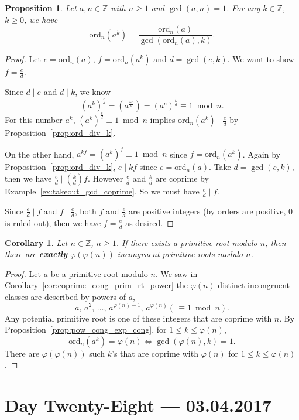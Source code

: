\documentclass{amsbook}
\theoremstyle{plain}
\newtheorem{corollary}[theorem]{Corollary}
\newtheorem{proposition}[theorem]{Proposition}
\theoremstyle{definition}
\theoremstyle{remark}
\numberwithin{equation}{chapter}
\numberwithin{figure}{chapter}
\newcommand{\Z}{\mathbb{Z}}
\newcommand*{\ord}{\text{ord}}
\begin{document}
\begin{proposition}\label{prop:ord_pow}
  Let $a, n \in \Z$ with $n \geqslant 1$ and $\gcd (a, n) = 1$. For any $k \in \Z$, $k \geqslant 0$, we have 
\[
\ord_n (a^k) = \frac{\ord_n (a)}{\gcd (\ord_n (a), k)}.
\]
\end{proposition}
\begin{proof}
  Let $e = \ord_n (a)$, $f = \ord_n (a^k)$ and $d = \gcd (e, k)$. We want to show $f = \frac{e}d$.

  Since $d \mid e$ and $d \mid k$, we know
  \[
    (a^k)^\frac{e}d = (a^{\frac{ke}d}) = (a^e)^{\frac{k}d} \equiv 1 \bmod n.
  \]
  For this number $a^k$, $(a^k)^{\frac{e}d} \equiv 1 \bmod n$ implies $\ord_n (a^k) \mid \frac{e}d$ by Proposition~\ref{prop:ord_div_k}.

  On the other hand, $a^{kf} = (a^k)^f \equiv 1 \bmod n$ since $f = \ord_n (a^k)$. Again by Proposition~\ref{prop:ord_div_k}, $e \mid kf$ since $e = \ord_n (a)$. Take $d = \gcd (e, k)$, then we have $\frac{e}d \mid \left(\frac{k}d \right)f$. However $\frac{e}d$ and $\frac{k}d$ are coprime by Example~\ref{ex:takeout_gcd_coprime}. So we must have $\frac{e}d \mid f$.

  Since $\frac{e}d \mid f$ and $f \mid \frac{e}d$, both $f$ and $\frac{e}d$ are positive integers (by orders are positive, $0$ is ruled out), then we have $f = \frac{e}d$ as desired.
\end{proof}
\begin{corollary}
  Let $n \in \Z$, $n \geqslant 1$. If there exists a primitive root modulo $n$, then there are \textbf{exactly} $\varphi (\varphi (n))$ incongruent primitive roots modulo $n$.
\end{corollary}
\begin{proof}
  Let $a$ be a primitive root modulo $n$. We saw in Corollary~\ref{cor:coprime_cong_prim_rt_power} the $\varphi (n)$ distinct incongruent classes are described by powers of $a$,
  \[
    a, \, a^2, \,\ldots,\, a^{\varphi(n) - 1}, \, a^{\varphi(n)} (\,\equiv 1 \bmod n).
  \]
  Any potential primitive root is one of these integers that are coprime with $n$. By Proposition~\ref{prop:pow_cong_exp_cong}, for $1 \leqslant k \leqslant \varphi (n)$,
  \[
    \ord_n (a^k) = \varphi (n) \iff \gcd (\varphi(n), k) = 1.
  \]
  There are $\varphi (\varphi (n))$ such $k$'s that are coprime with $\varphi (n)$ for $1 \leqslant k \leqslant \varphi (n)$.
\end{proof}  
\chapter[Lecture Twenty-Eight]{Day Twenty-Eight \hfill {\footnotesize \rm --- 03.04.2017}}
\end{document}
